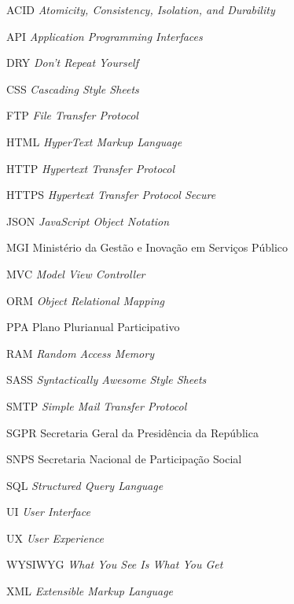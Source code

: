 \begin{siglas}
    \item[ACID] \textit{Atomicity, Consistency, Isolation, and Durability}
    \item[API] \textit{Application Programming Interfaces}
    \item[DRY] \textit{Don't Repeat Yourself}
    \item[CSS] \textit{Cascading Style Sheets}
    \item[FTP] \textit{File Transfer Protocol}
    \item[HTML] \textit{HyperText Markup Language}
    \item[HTTP] \textit{Hypertext Transfer Protocol}
    \item[HTTPS] \textit{Hypertext Transfer Protocol Secure}
    \item[JSON] \textit{JavaScript Object Notation}
    \item[MGI] Ministério da Gestão e Inovação em Serviços Público
    \item[MVC] \textit{Model View Controller}
    \item[ORM] \textit{Object Relational Mapping}
    \item[PPA] Plano Plurianual Participativo
    \item[RAM] \textit{Random Access Memory}
    \item[SASS] \textit{Syntactically Awesome Style Sheets}
    \item[SMTP] \textit{Simple Mail Transfer Protocol}
    \item[SGPR] Secretaria Geral da Presidência da República
    \item[SNPS] Secretaria Nacional de Participação Social
    \item[SQL] \textit{Structured Query Language}
    \item[UI] \textit{User Interface}
    \item[UX] \textit{User Experience}
    \item[WYSIWYG] \textit{What You See Is What You Get}
    \item[XML] \textit{Extensible Markup Language}
\end{siglas}
